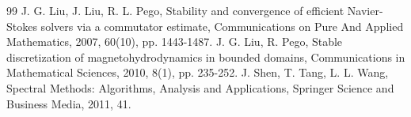 \documentclass[10pt,a4paper]{amsart}
\theoremstyle{thmm}
\begin{document}
\begin{thebibliography}{99}
 J. G. Liu, J. Liu, R. L. Pego, Stability and convergence of efficient Navier-Stokes solvers via a commutator estimate, Communications on Pure And Applied Mathematics, 2007, 60(10), pp. 1443-1487.
 J. G. Liu, R. Pego, Stable discretization of magnetohydrodynamics in bounded domains, Communications in Mathematical Sciences, 2010, 8(1), pp. 235-252.
 J. Shen, T. Tang, L. L. Wang, Spectral Methods: Algorithms, Analysis and Applications, Springer Science and Business Media, 2011, 41.
\end{thebibliography}
\end{document}
